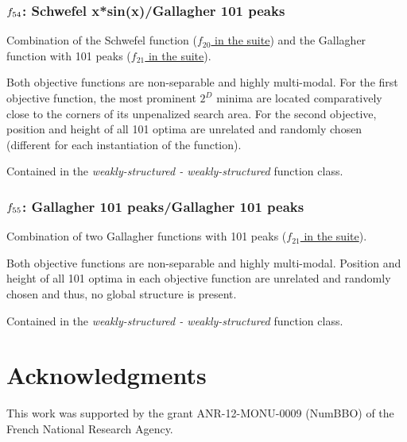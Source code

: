\documentclass[letterpaper,12pt,english]{article}
\begin{document}
\subsubsection{\protect\(f_{54}\protect\): Schwefel x*sin(x)/Gallagher 101 peaks}
\label{index:f54}\label{index:schwefel-x-sin-x-gallagher-101-peaks}
Combination of the Schwefel function (\href{http://coco.lri.fr/downloads/download15.03/bbobdocfunctions.pdf\#page=100}{\(f_{20}\) in the  suite}) and the Gallagher function with
101 peaks (\href{http://coco.lri.fr/downloads/download15.03/bbobdocfunctions.pdf\#page=105}{\(f_{21}\) in the  suite}).

Both objective functions are non-separable and highly multi-modal.
For the first objective function, the most prominent \(2^D\) minima
are located comparatively close to the corners of its unpenalized search
area. For the second objective, position and height of all
101 optima are unrelated and randomly
chosen (different for each instantiation of the function).

Contained in the \emph{weakly-structured - weakly-structured} function class.


\subsubsection{\protect\(f_{55}\protect\): Gallagher 101 peaks/Gallagher 101 peaks}
\label{index:gallagher-101-peaks-gallagher-101-peaks}\label{index:f55}
Combination of two Gallagher functions with
101 peaks (\href{http://coco.lri.fr/downloads/download15.03/bbobdocfunctions.pdf\#page=105}{\(f_{21}\) in the  suite}).

Both objective functions are non-separable and highly multi-modal.
Position and height of all 101 optima in each objective function
are unrelated and randomly chosen and thus, no global structure
is present.

Contained in the \emph{weakly-structured - weakly-structured} function class.
\section*{Acknowledgments}
This work was supported by the grant ANR-12-MONU-0009 (NumBBO)
of the French National Research Agency.
\end{document}
